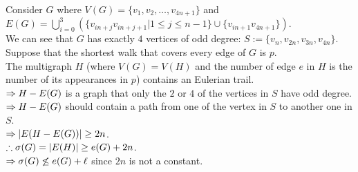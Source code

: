 \begin{pr}
\begin{enumerate}[(i)]
Consider $G$ where $V(G)=\{v_1, v_2, \dots, v_{4n+1}\}$ and $E(G)=\bigcup_{i=0}^3(\{v_{in+j}v_{in+j+1}|1\leq j\leq n-1\}\cup\{v_{in+1}v_{4n+1}\})$.\\
We can see that $G$ has exactly $4$ vertices of odd degree: $S:=\{v_n, v_{2n}, v_{3n}, v_{4n}\}$.\\
Suppose that the shortest walk that covers every edge of $G$ is $p$.\\
The multigraph $H$ (where $V(G)=V(H)$ and the number of edge $e$ in $H$ is the number of its appearances in $p$) contains an Eulerian trail.\\
$\Rightarrow H-E(G)$ is a graph that only the $2$ or $4$ of the vertices in $S$ have odd degree.\\
$\Rightarrow H-E(G)$ should contain a path from one of the vertex in $S$ to another one in $S$.\\
$\Rightarrow|E(H-E(G))|\geq2n$.\\
$\therefore\sigma(G)=|E(H)|\geq e(G)+2n$.\\
$\Rightarrow\sigma(G)\not\leq e(G)+\ell$ since $2n$ is not a constant.
\end{enumerate}
\end{pr}
